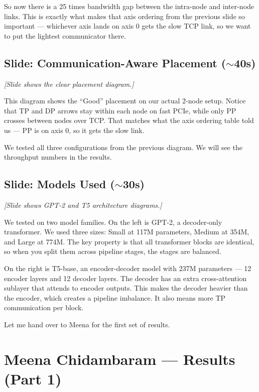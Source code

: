 \documentclass[11pt, a4paper]{article}
\begin{document}
So now there is a 25 times bandwidth gap between the intra-node and inter-node links. This is exactly what makes that axis ordering from the previous slide so important --- whichever axis lands on axis 0 gets the slow TCP link, so we want to put the lightest communicator there.

\subsection{Slide: Communication-Aware Placement ($\sim$40s)}
\textit{[Slide shows the clear placement diagram.]}

This diagram shows the ``Good'' placement on our actual 2-node setup. Notice that TP and DP arrows stay within each node on fast PCIe, while only PP crosses between nodes over TCP. That matches what the axis ordering table told us --- PP is on axis 0, so it gets the slow link.

We tested all three configurations from the previous diagram. We will see the throughput numbers in the results.

\subsection{Slide: Models Used ($\sim$30s)}
\textit{[Slide shows GPT-2 and T5 architecture diagrams.]}

We tested on two model families. On the left is GPT-2, a decoder-only transformer. We used three sizes: Small at 117M parameters, Medium at 354M, and Large at 774M. The key property is that all transformer blocks are identical, so when you split them across pipeline stages, the stages are balanced.

On the right is T5-base, an encoder-decoder model with 237M parameters --- 12 encoder layers and 12 decoder layers. The decoder has an extra cross-attention sublayer that attends to encoder outputs. This makes the decoder heavier than the encoder, which creates a pipeline imbalance. It also means more TP communication per block.

Let me hand over to Meena for the first set of results.

\section{Meena Chidambaram --- Results (Part 1)}
\end{document}
